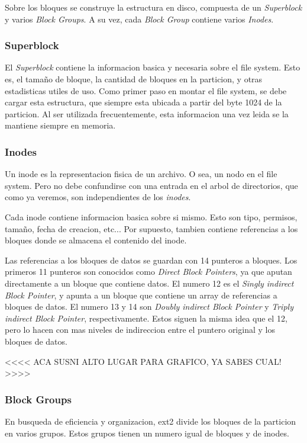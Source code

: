 \documentclass[a4paper,10pt]{article}
\begin{document}
Sobre los bloques se construye la estructura en disco, compuesta de un \textit{Superblock} y varios \textit{Block Groups}.
A su vez, cada \textit{Block Group} contiene varios \textit{Inodes}.

\subsubsection{Superblock}
El \textit{Superblock} contiene la informacion basica y necesaria sobre el file system.
Esto es, el tamaño de bloque, la cantidad de bloques en la particion, y otras estadisticas utiles de uso.
Como primer paso en montar el file system, se debe cargar esta estructura, que siempre esta ubicada a partir del byte 1024 de la particion.
Al ser utilizada frecuentemente, esta informacion una vez leida se la mantiene siempre en memoria.

\subsubsection{Inodes}
Un inode es la representacion fisica de un archivo.
O sea, un nodo en el file system.
Pero no debe confundirse con una entrada en el arbol de directorios, que como ya veremos, son independientes de los \textit{inodes}.

Cada inode contiene informacion basica sobre si mismo.
Esto son tipo, permisos, tamaño, fecha de creacion, etc...
Por supuesto, tambien contiene referencias a los bloques donde se almacena el contenido del inode.

Las referencias a los bloques de datos se guardan con 14 punteros a bloques.
Los primeros 11 punteros son conocidos como \textit{Direct Block Pointers}, ya que aputan directamente a un bloque que contiene datos.
El numero 12 es el \textit{Singly indirect Block Pointer}, y apunta a un bloque que contiene un array de referencias a bloques de datos.
El numero 13 y 14 son \textit{Doubly indirect Block Pointer} y \textit{Triply indirect Block Pointer}, respectivamente.
Estos siguen la misma idea que el 12, pero lo hacen con mas niveles de indireccion entre el puntero original y los bloques de datos.

    <<<< ACA SUSNI ALTO LUGAR PARA GRAFICO, YA SABES CUAL! >>>>

\subsubsection{Block Groups}
En busqueda de eficiencia y organizacion, ext2 divide los bloques de la particion en varios grupos.
Estos grupos tienen un numero igual de bloques y de inodes.
\end{document}
